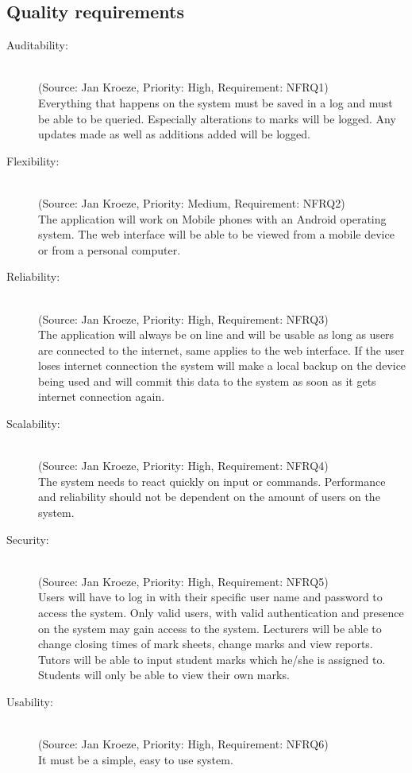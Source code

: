 \documentclass[12pt]{article}
\begin{document}
  \subsection{Quality requirements}
\begin{description}
  \item[Auditability:] \hfill  \\
  (Source: Jan Kroeze, Priority: High, Requirement: NFRQ1) \\
  Everything that happens on the system must be saved in a log and must be able to be queried. Especially alterations to marks will be logged. Any updates made as well as additions added will be logged. \\
  \item[Flexibility:] \hfill \\
  (Source: Jan Kroeze, Priority: Medium, Requirement: NFRQ2) \\
  The application will work on Mobile phones with an Android operating system. The web interface will be able to be viewed from a mobile device or from a personal computer.\\
  \item[Reliability:] \hfill \\
  (Source: Jan Kroeze, Priority: High, Requirement: NFRQ3) \\
  The application will always be on line and will be usable as long as users are connected to the internet, same applies to the web interface. If the user loses internet connection the system will make a local backup on the device being used and will commit this data to the system as soon as it gets internet connection again.\\
  \item[Scalability:] \hfill \\
  (Source: Jan Kroeze, Priority: High, Requirement: NFRQ4) \\
  The system needs to react quickly on input or commands. Performance and reliability should not be dependent on the amount of users on the system.\\
  \item[Security:] \hfill \\
  (Source: Jan Kroeze, Priority: High, Requirement: NFRQ5) \\
  Users will have to log in with their specific user name and password to access the system. Only valid users, with valid authentication and presence on the system may gain access to the system. Lecturers will be able to change closing times of mark sheets, change marks and view reports. Tutors will be able to input student marks which he/she is assigned to. Students will only be able to view their own marks.  \\
  \item[Usability:] \hfill \\
  (Source: Jan Kroeze, Priority: High, Requirement: NFRQ6) \\
  It must be a simple, easy to use system.
\end{description} 
\end{document}
